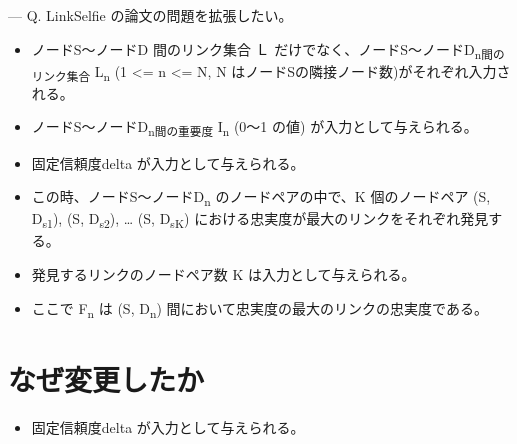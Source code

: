 \documentclass[conference]{IEEEtran}
\newenvironment{raddblock}{\color{red}}{}
\begin{document}
--- 
Q. LinkSelfie の論文の問題を拡張したい。


\begin{itemize}
\item ノードS〜ノードD 間のリンク集合 Ｌ だけでなく、ノードS〜ノードD\textsubscript{n間のリンク集合} L\textsubscript{n} (1 <= n <= N, N はノードSの隣接ノード数)がそれぞれ入力される。

\item ノードS〜ノードD\textsubscript{n間の重要度} I\textsubscript{n} (0〜1 の値) が入力として与えられる。
\end{itemize}



\begin{raddblock}
\begin{itemize}
\item 固定信頼度delta が入力として与えられる。
\end{itemize}
\end{raddblock}

\begin{itemize}
\item この時、ノードS〜ノードD\textsubscript{n} のノードペアの中で、K 個のノードペア (S, D\textsubscript{s}\textsubscript{1}), (S, D\textsubscript{s}\textsubscript{2}), \ldots{} (S, D\textsubscript{s}\textsubscript{K}) における忠実度が最大のリンクをそれぞれ発見する。
\end{itemize}

\begin{raddblock}
\begin{itemize}
\item 発見するリンクのノードペア数 K は入力として与えられる。
\end{itemize}
\end{raddblock}

\begin{itemize}
\item ここで F\textsubscript{n} は (S, D\textsubscript{n}) 間において忠実度の最大のリンクの忠実度である。
\end{itemize}


\section{なぜ変更したか}
\label{sec:orgd7a0111}


\begin{raddblock}
\begin{itemize}
\item 固定信頼度delta が入力として与えられる。
\end{itemize}
\end{raddblock}
\end{document}
